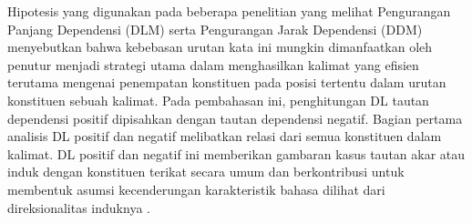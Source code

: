 Hipotesis yang digunakan pada beberapa penelitian yang melihat Pengurangan Panjang Dependensi (DLM) \citep{futrell2015large} serta Pengurangan Jarak Dependensi (DDM) \citep{liu2017dependency} menyebutkan bahwa kebebasan urutan kata ini mungkin dimanfaatkan oleh penutur menjadi strategi utama dalam menghasilkan kalimat yang efisien terutama mengenai penempatan konstituen pada posisi tertentu dalam urutan konstituen sebuah kalimat. Pada pembahasan ini, penghitungan DL tautan dependensi positif dipisahkan dengan tautan dependensi negatif. Bagian pertama analisis DL positif dan negatif melibatkan relasi dari semua konstituen dalam kalimat. DL positif dan negatif ini memberikan gambaran kasus tautan akar atau induk dengan konstituen terikat secara umum dan berkontribusi untuk membentuk asumsi kecenderungan karakteristik bahasa dilihat dari direksionalitas induknya \citep{wang2017effects}. 

